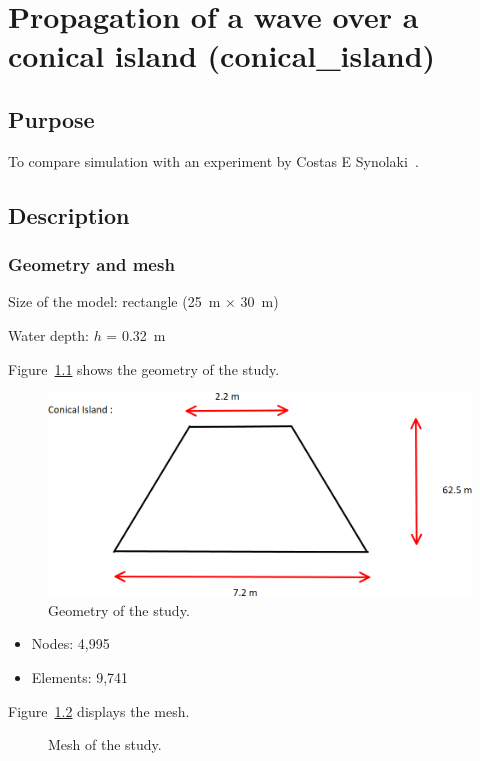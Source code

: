 \chapter{Propagation of a wave over a conical island (conical\_island)}

\section{Purpose}

To compare  simulation with an experiment by Costas E
Synolaki~\cite{Costas2007}.

\section{Description}

\subsection{Geometry and mesh}

Size of the model: rectangle (25~m $\times$ 30~m)

Water depth: $h$ = 0.32~m

Figure~\ref{fig:island:geometry} shows the geometry of the study.

\begin{figure}[H]
\centering
\includegraphics[width=.6\textwidth]{img/geometry.png}
\caption{Geometry of the study.}\label{fig:island:geometry}
\end{figure}

\begin{itemize}
\item Nodes: 4,995
\item Elements: 9,741
\end{itemize}

Figure~\ref{fig:island:mesh} displays the mesh.

\begin{figure}[H]
\centering
{}
\caption{Mesh of the study.}\label{fig:island:mesh}
\end{figure}

